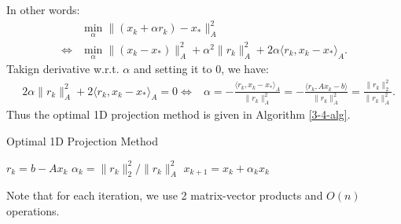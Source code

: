 \documentclass[../main/main.tex]{subfiles}
\begin{document}
In other words:
\begin{align*}
 & \min _{\alpha } \|(x_{k}+\alpha r_{k})-x_{*}\|_{A}^2\\
 \iff & \min _{\alpha }\|(x_{k}-x_{*})\|^2_{A}+ \alpha ^2 \|r_{k}\|_{A}^2 + 2\alpha \langle r_{k}, x_{k}-x_{*}\rangle_{A}
  .\end{align*}
Takign derivative w.r.t. $\alpha $ and setting it to 0, we have:
\begin{align*}
&  2\alpha \|r_{k}\|_{A}^2 + 2\langle r_{k}, x_{k}-x_{*}\rangle_{A}=0
                 \iff & \alpha = - \frac{\langle r_{k}, x_{k}- x_{*}\rangle_{A}}{\|r_{k}\|_{A}^2} =  - \frac{\langle r_{k}, Ax_{k}- b\rangle}{\|r_{k}\|_{A}^2}  = \frac{\|r_{k}\|_{2}^2}{\|r_{k}\|_{A}^2}
  .\end{align*}
Thus the optimal 1D projection method is given in Algorithm \ref{3-4-alg}.
        \begin{algorithm}[h!]
	\caption{Optimal 1D Projection Method}
    \label{3-4-alg}
	\begin{algorithmic}[1]
 \State $r_{k}=b-Ax_{k}$
 \State $\alpha _{k} = \|r_{k}\|^2_{2} / \|r_{k}\|_{A}^2$
 \State $x_{k+1} = x_{k}+\alpha _{k}x_{k}$
      \EndFor
	\end{algorithmic}
	\end{algorithm}
  \begin{remark}
Note that for each iteration, we use 2 matrix-vector products and $O(n)$ operations.
  \end{remark}
\end{document}

